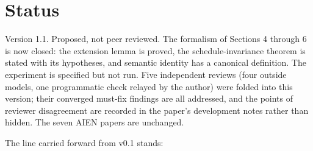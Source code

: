 \documentclass[11pt]{article}
\begin{document}
\section{Status}

Version 1.1. Proposed, not peer reviewed. The formalism of Sections 4 through 6 is now closed: the extension lemma is proved, the schedule-invariance theorem is stated with its hypotheses, and semantic identity has a canonical definition. The experiment is specified but not run. Five independent reviews (four outside models, one programmatic check relayed by the author) were folded into this version; their converged must-fix findings are all addressed, and the points of reviewer disagreement are recorded in the paper's development notes rather than hidden. The seven AIEN papers are unchanged.

The line carried forward from v0.1 stands:

\begin{center}
\end{center}
\end{document}
